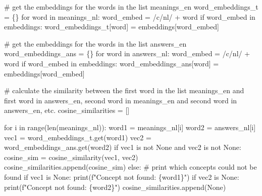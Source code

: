 \documentclass[
  letterpaper,
  DIV=11,
  numbers=noendperiod]{scrreprt}
\newenvironment{Shaded}{\begin{snugshade}}{\end{snugshade}}
\newcommand{\BuiltInTok}[1]{\textcolor[rgb]{0.00,0.23,0.31}{#1}}
\newcommand{\CommentTok}[1]{\textcolor[rgb]{0.37,0.37,0.37}{#1}}
\newcommand{\ControlFlowTok}[1]{\textcolor[rgb]{0.00,0.23,0.31}{#1}}
\newcommand{\KeywordTok}[1]{\textcolor[rgb]{0.00,0.23,0.31}{#1}}
\newcommand{\NormalTok}[1]{\textcolor[rgb]{0.00,0.23,0.31}{#1}}
\newcommand{\OperatorTok}[1]{\textcolor[rgb]{0.37,0.37,0.37}{#1}}
\newcommand{\SpecialCharTok}[1]{\textcolor[rgb]{0.37,0.37,0.37}{#1}}
\newcommand{\SpecialStringTok}[1]{\textcolor[rgb]{0.13,0.47,0.30}{#1}}
\newcommand{\StringTok}[1]{\textcolor[rgb]{0.13,0.47,0.30}{#1}}
\newcommand{\VariableTok}[1]{\textcolor[rgb]{0.07,0.07,0.07}{#1}}
\begin{document}
\begin{Shaded}
\begin{Highlighting}[]
\CommentTok{\# get the embeddings for the words in the list meanings\_en}
\NormalTok{word\_embeddings\_t }\OperatorTok{=}\NormalTok{ \{\}}
\ControlFlowTok{for}\NormalTok{ word }\KeywordTok{in}\NormalTok{ meanings\_nl:}
\NormalTok{    word\_embed }\OperatorTok{=} \StringTok{\textquotesingle{}/c/nl/\textquotesingle{}} \OperatorTok{+}\NormalTok{ word}
    \ControlFlowTok{if}\NormalTok{ word\_embed }\KeywordTok{in}\NormalTok{ embeddings:}
\NormalTok{        word\_embeddings\_t[word] }\OperatorTok{=}\NormalTok{ embeddings[word\_embed]}

\CommentTok{\# get the embeddings for the words in the list answers\_en}
\NormalTok{word\_embeddings\_ans }\OperatorTok{=}\NormalTok{ \{\}}
\ControlFlowTok{for}\NormalTok{ word }\KeywordTok{in}\NormalTok{ answers\_nl:}
\NormalTok{    word\_embed }\OperatorTok{=} \StringTok{\textquotesingle{}/c/nl/\textquotesingle{}} \OperatorTok{+}\NormalTok{ word}
    \ControlFlowTok{if}\NormalTok{ word\_embed }\KeywordTok{in}\NormalTok{ embeddings:}
\NormalTok{        word\_embeddings\_ans[word] }\OperatorTok{=}\NormalTok{ embeddings[word\_embed]}

\CommentTok{\# calculate the similarity between the first word in the list meanings\_en and first word in answers\_en, second word in meanings\_en and second word in answers\_en, etc.}
\NormalTok{cosine\_similarities }\OperatorTok{=}\NormalTok{ []}

\ControlFlowTok{for}\NormalTok{ i }\KeywordTok{in} \BuiltInTok{range}\NormalTok{(}\BuiltInTok{len}\NormalTok{(meanings\_nl)):}
\NormalTok{    word1 }\OperatorTok{=}\NormalTok{ meanings\_nl[i]}
\NormalTok{    word2 }\OperatorTok{=}\NormalTok{ answers\_nl[i]}
\NormalTok{    vec1 }\OperatorTok{=}\NormalTok{ word\_embeddings\_t.get(word1)}
\NormalTok{    vec2 }\OperatorTok{=}\NormalTok{ word\_embeddings\_ans.get(word2)}
    \ControlFlowTok{if}\NormalTok{ vec1 }\KeywordTok{is} \KeywordTok{not} \VariableTok{None} \KeywordTok{and}\NormalTok{ vec2 }\KeywordTok{is} \KeywordTok{not} \VariableTok{None}\NormalTok{:}
\NormalTok{        cosine\_sim }\OperatorTok{=}\NormalTok{ cosine\_similarity(vec1, vec2)}
\NormalTok{        cosine\_similarities.append(cosine\_sim)}
    \ControlFlowTok{else}\NormalTok{:}
        \CommentTok{\# print which concepts could not be found}
        \ControlFlowTok{if}\NormalTok{ vec1 }\KeywordTok{is} \VariableTok{None}\NormalTok{:}
            \BuiltInTok{print}\NormalTok{(}\SpecialStringTok{f"Concept not found: }\SpecialCharTok{\{}\NormalTok{word1}\SpecialCharTok{\}}\SpecialStringTok{"}\NormalTok{)}
        \ControlFlowTok{if}\NormalTok{ vec2 }\KeywordTok{is} \VariableTok{None}\NormalTok{:}
            \BuiltInTok{print}\NormalTok{(}\SpecialStringTok{f"Concept not found: }\SpecialCharTok{\{}\NormalTok{word2}\SpecialCharTok{\}}\SpecialStringTok{"}\NormalTok{)}
\NormalTok{        cosine\_similarities.append(}\VariableTok{None}\NormalTok{)}


\end{Highlighting}
\end{Shaded}
\end{document}
